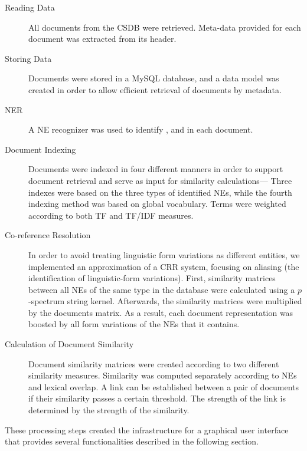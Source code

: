 \begin{description}
\item[Reading Data] All documents from the CSDB were retrieved. Meta-data provided for each document was extracted from its header.
\item[Storing Data] Documents were stored in a MySQL database, and a data model was created in order to allow efficient retrieval of documents by metadata.
\item[NER] A NE recognizer was used to identify ,  and  in each document.
\item[Document Indexing] Documents were indexed in four different manners in order to support document retrieval and serve as input for similarity calculations--- Three indexes were based on the three types of identified NEs, while the fourth indexing method was based on global vocabulary. Terms were weighted according to both TF and TF/IDF measures.
\item[Co-reference Resolution] In order to avoid treating linguistic form variations as different entities, we implemented an approximation of a CRR system, focusing on aliasing (the identification of linguistic-form variations).
First, similarity matrices between all NEs of the same type in the database were calculated using a $p$-spectrum string kernel.
Afterwards, the similarity matrices were multiplied by the documents matrix. As a result, each document representation was boosted by all form 
variations of the NEs that it contains.
\item[Calculation of Document Similarity] Document similarity matrices were created according to two different similarity measures. 
Similarity was computed separately according to NEs and lexical overlap. 
A link can be established between a pair of documents if their similarity passes a certain threshold. 
The strength of the link is determined by the strength of the similarity.
\end{description}

These processing steps created the infrastructure for a graphical user interface that provides several
functionalities described in the following section.

